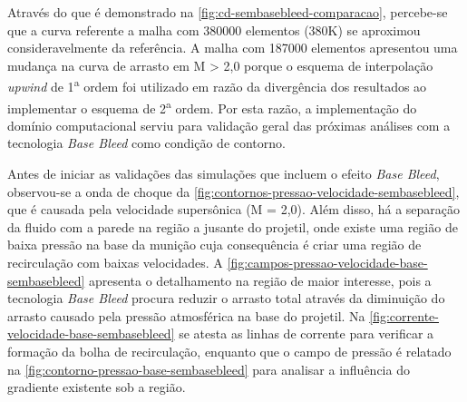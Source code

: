 Através do que é demonstrado na \autoref{fig:cd-sembasebleed-comparacao}, percebe-se que a curva referente a malha com \num{380000} elementos (380K) se aproximou consideravelmente da referência. A malha com \num{187000} elementos apresentou uma mudança na curva de arrasto em M > 2,0 porque o esquema de interpolação \textit{upwind} de 1\textsuperscript{a} ordem foi utilizado em razão da divergência dos resultados ao implementar o esquema de 2\textsuperscript{a} ordem. Por esta razão, a implementação do domínio computacional serviu para validação geral das próximas análises com a tecnologia \textit{Base Bleed} como condição de contorno.

Antes de iniciar as validações das simulações que incluem o efeito \textit{Base Bleed}, observou-se a onda de choque da \autoref{fig:contornos-pressao-velocidade-sembasebleed}, que é causada pela velocidade supersônica (M = 2,0). Além disso, há a separação da fluido com a parede na região a jusante do projetil, onde existe uma região de baixa pressão na base da munição cuja consequência é criar uma região de recirculação com baixas velocidades. A \autoref{fig:campos-pressao-velocidade-base-sembasebleed} apresenta o detalhamento na região de maior interesse, pois a tecnologia \textit{Base Bleed} procura reduzir o arrasto total através da diminuição do arrasto causado pela pressão atmosférica na base do projetil. Na \autoref{fig:corrente-velocidade-base-sembasebleed} se atesta as linhas de corrente para verificar a formação da bolha de recirculação, enquanto que o campo de pressão é relatado na \autoref{fig:contorno-pressao-base-sembasebleed} para analisar a influência do gradiente existente sob a região.

